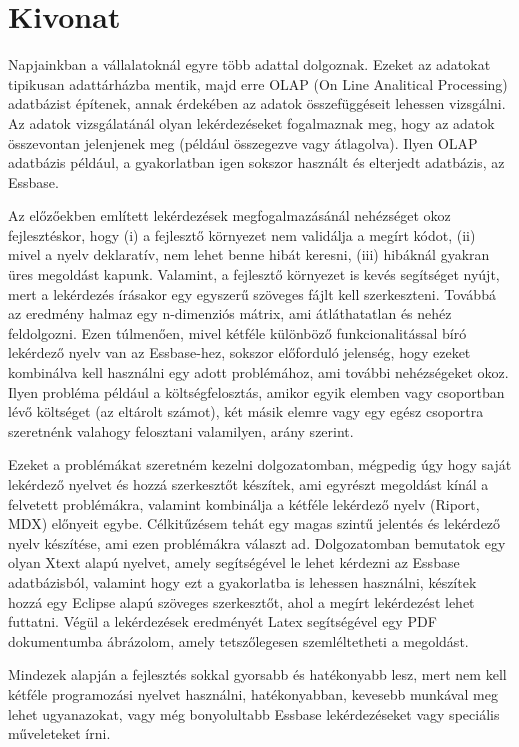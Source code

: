 \chapter*{Kivonat}
Napjainkban a vállalatoknál egyre több adattal dolgoznak. Ezeket az adatokat tipikusan adattárházba mentik, majd erre OLAP (On Line Analitical Processing) adatbázist építenek, annak érdekében az adatok összefüggéseit lehessen vizsgálni. Az adatok vizsgálatánál olyan lekérdezéseket fogalmaznak meg, hogy az adatok összevontan jelenjenek meg (például összegezve vagy átlagolva). Ilyen OLAP adatbázis például, a gyakorlatban igen sokszor használt és elterjedt adatbázis, az Essbase.

Az előzőekben említett lekérdezések megfogalmazásánál nehézséget okoz fejlesztéskor, hogy (i) a fejlesztő környezet nem validálja a megírt kódot, (ii) mivel a nyelv deklaratív, nem lehet benne hibát keresni, (iii) hibáknál gyakran üres megoldást kapunk. Valamint, a fejlesztő környezet is kevés segítséget nyújt, mert a lekérdezés írásakor egy egyszerű szöveges fájlt kell szerkeszteni. Továbbá az eredmény halmaz egy n-dimenziós mátrix, ami átláthatatlan és nehéz feldolgozni. Ezen túlmenően, mivel kétféle különböző funkcionalitással bíró lekérdező nyelv van az Essbase-hez, sokszor előforduló jelenség, hogy ezeket kombinálva kell használni egy adott problémához, ami további nehézségeket okoz. Ilyen probléma például a költségfelosztás, amikor egyik elemben vagy csoportban lévő költséget (az eltárolt számot), két másik elemre vagy egy egész csoportra szeretnénk valahogy felosztani valamilyen, arány szerint.

Ezeket a problémákat szeretném kezelni dolgozatomban, mégpedig úgy hogy saját lekérdező nyelvet és hozzá szerkesztőt készítek, ami egyrészt megoldást kínál a felvetett problémákra, valamint kombinálja a kétféle lekérdező nyelv (Riport, MDX) előnyeit egybe. Célkitűzésem tehát egy magas szintű jelentés és lekérdező nyelv készítése, ami ezen problémákra választ ad.
Dolgozatomban bemutatok egy olyan Xtext alapú nyelvet, amely segítségével le lehet kérdezni az Essbase adatbázisból, valamint hogy ezt a gyakorlatba is lehessen használni, készítek hozzá egy Eclipse alapú szöveges szerkesztőt, ahol a megírt lekérdezést lehet futtatni. Végül a lekérdezések eredményét Latex segítségével egy PDF dokumentumba ábrázolom, amely tetszőlegesen szemléltetheti a megoldást.

Mindezek alapján a fejlesztés sokkal gyorsabb és hatékonyabb lesz, mert nem kell kétféle programozási nyelvet használni, hatékonyabban, kevesebb munkával meg lehet ugyanazokat, vagy még bonyolultabb Essbase lekérdezéseket vagy speciális műveleteket írni.


 
